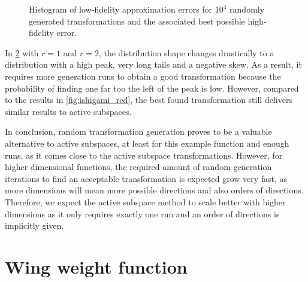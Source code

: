 \documentclass[
  a4paper,  %
  twoside,  %
  bibliography=totoc,
  headsepline,
  cleardoublepage=empty,
  parskip=half,
  draft=false
]{scrbook}
\begin{document}
\begin{mdframed}[style=style]
\begin{figure}[H]
\begin{subfigure}{.5\textwidth}
\vspace{3mm}
\label{fig:ishigami_hist_1}
\end{subfigure}
\delimit
  \caption{Histogram of low-fidelity approximation errors for $10^4$ randomly generated transformations and the associated best possible high-fidelity error.}
\label{fig:ishigami_hists_red}
\end{figure}
\end{mdframed}
%
In \cref{fig:ishigami_hists_red} with $r=1$ and $r=2$, the distribution shape changes drastically to a distribution with a high peak, very long tails and a negative skew.
As a result, it requires more generation runs to obtain a good transformation because the probability of finding one far too the left of the peak is low.
However, compared to the results in \cref{fig:ishigami_red}, the best found transformation still delivers similar results to active subspaces.

In conclusion, random transformation generation proves to be a valuable alternative to active subspaces, at least for this example function and enough runs, as it comes close to the active subspace transformations.
However, for higher dimensional functions, the required amount of random generation iterations to find an acceptable transformation is expected grow very fast, as more dimensions will mean more possible directions and also orders of directions.
Therefore, we expect the active subspace method to scale better with higher dimensions as it only requires exactly one run and an order of directions is implicitly given.

\newpage
\section{Wing weight function}
\end{document}
